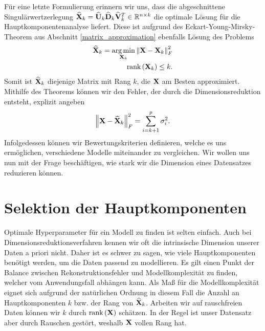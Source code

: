 Für eine letzte Formulierung erinnern wir uns, dass die abgeschnittene Singulärwertzerlegung $\widehat{\mathbf{X}}_k = \widehat{\mathbf{U}}_k \widehat{\mathbf{D}}_k \widehat{\mathbf{V}}_k^T \in \mathbb{R}^{n \times k}$ die optimale Lösung für die Hauptkomponentenanalyse liefert. Diese ist aufgrund des Eckart-Young-Mirsky-Theorem aus Abschnitt \ref{matrix_approximation} ebenfalls Lösung des Problems
\begin{align}
\label{pca_best_rank_approximation}
\begin{split}
\widehat{\mathbf{X}}_k = \operatorname*{arg\,min}_{\mathbf{X}_k} \left\lVert \mathbf{X} - \mathbf{X}_k \right\rVert_F^2\\
\text{rank} \left( \mathbf{X}_k \right) \leq k.
\end{split}
\end{align}
Somit ist $\widehat{\mathbf{X}}_k$ diejenige Matrix mit Rang $k$, die $\mathbf{X}$ am Besten approximiert. Mithilfe des Theorems können wir den Fehler, der durch die Dimensionsreduktion entsteht, explizit angeben
\begin{align*}
\left\lVert \mathbf{X} - \widehat{\mathbf{X}}_k \right\rVert_F^2 = \sum_{i=k+1}^p \sigma_i^2.
\end{align*}
Infolgedessen können wir Bewertungskriterien definieren, welche es uns ermöglichen, verschiedene Modelle miteinander zu vergleichen. Wir wollen uns nun mit der Frage beschäftigen, wie stark wir die Dimension eines Datensatzes reduzieren können.




\section{Selektion der Hauptkomponenten}
\label{selection_principal_components}

Optimale Hyperparameter für ein Modell zu finden ist selten einfach. Auch bei Dimensionsreduktionsverfahren kennen wir oft die intrinsische Dimension unserer Daten a priori nicht. Daher ist es schwer zu sagen, wie viele Hauptkomponenten benötigt werden, um die Daten passend zu modellieren. Es gilt einen Punkt der Balance zwischen Rekonstruktionsfehler und Modellkomplexität zu finden, welcher vom Anwendungsfall abhängen kann. Als Maß für die Modellkomplexität eignet sich aufgrund der natürlichen Ordnung in diesem Fall die Anzahl an Hauptkomponenten $k$ bzw. der Rang von $\widehat{\mathbf{X}}_k$. Arbeiten wir auf rauschfreien Daten können wir $k$ durch $\text{rank} \left( \mathbf{X} \right)$ schätzen. In der Regel ist unser Datensatz aber durch Rauschen gestört, weshalb $\mathbf{X}$ vollen Rang hat.

